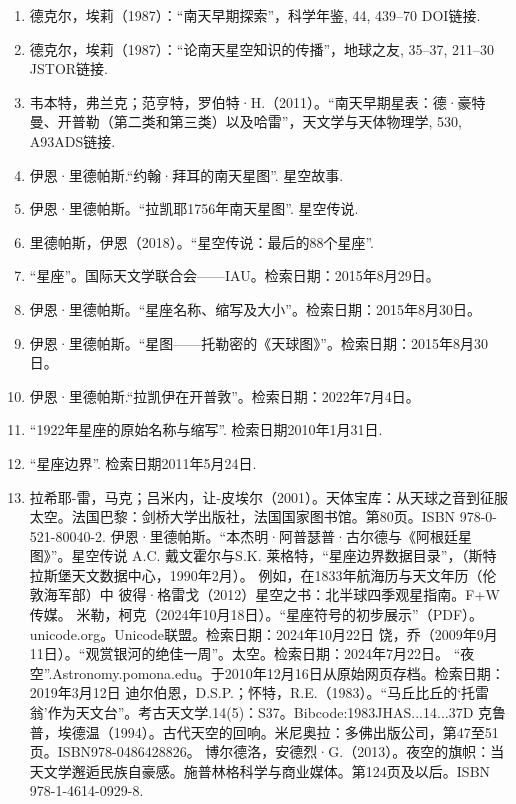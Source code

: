 \begin{enumerate}
\item 德克尔，埃莉（1987）：“南天早期探索”，科学年鉴, 44, 439–70 DOI链接.
\item 德克尔，埃莉（1987）：“论南天星空知识的传播”，地球之友, 35–37, 211–30 JSTOR链接.
\item 韦本特，弗兰克；范亨特，罗伯特·H.（2011）。“南天早期星表：德·豪特曼、开普勒（第二类和第三类）以及哈雷”，天文学与天体物理学, 530, A93ADS链接.
\item 伊恩·里德帕斯.“约翰·拜耳的南天星图”. 星空故事.
\item 伊恩·里德帕斯。“拉凯耶1756年南天星图”. 星空传说.
\item 里德帕斯，伊恩（2018）。“星空传说：最后的88个星座”.
\item “星座”。国际天文学联合会——IAU。检索日期：2015年8月29日。
\item 伊恩·里德帕斯。“星座名称、缩写及大小”。检索日期：2015年8月30日。
\item 伊恩·里德帕斯。“星图——托勒密的《天球图》”。检索日期：2015年8月30日。
\item 伊恩·里德帕斯.“拉凯伊在开普敦”。检索日期：2022年7月4日。
\item “1922年星座的原始名称与缩写”. 检索日期2010年1月31日.
\item “星座边界”. 检索日期2011年5月24日.
\item 拉希耶-雷，马克；吕米内，让-皮埃尔（2001）。天体宝库：从天球之音到征服太空。法国巴黎：剑桥大学出版社，法国国家图书馆。第80页。ISBN 978-0-521-80040-2.
 伊恩·里德帕斯。“本杰明·阿普瑟普·古尔德与《阿根廷星图》”。星空传说
 A.C. 戴文霍尔与S.K. 莱格特，“星座边界数据目录”，（斯特拉斯堡天文数据中心，1990年2月）。
 例如，在1833年航海历与天文年历（伦敦海军部）中
 彼得·格雷戈（2012）星空之书：北半球四季观星指南。F+W传媒。
 米勒，柯克（2024年10月18日）。“星座符号的初步展示”（PDF）。unicode.org。Unicode联盟。检索日期：2024年10月22日
 饶，乔（2009年9月11日）。“观赏银河的绝佳一周”。太空。检索日期：2024年7月22日。
 “夜空”.Astronomy.pomona.edu。于2010年12月16日从原始网页存档。检索日期：2019年3月12日
 迪尔伯恩，D.S.P.；怀特，R.E.（1983）。“马丘比丘的‘托雷翁’作为天文台”。考古天文学.14(5)：S37。Bibcode:1983JHAS...14...37D
 克鲁普，埃德温（1994）。古代天空的回响。米尼奥拉：多佛出版公司，第47至51页。ISBN978-0486428826。
 博尔德洛，安德烈·G.（2013）。夜空的旗帜：当天文学邂逅民族自豪感。施普林格科学与商业媒体。第124页及以后。ISBN 978-1-4614-0929-8.
\end{enumerate}